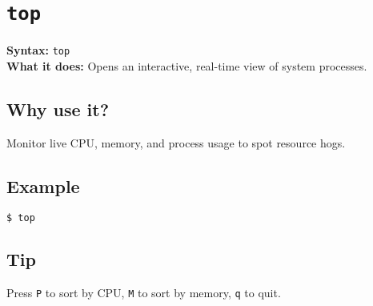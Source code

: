 \documentclass[10pt,oneside]{scrbook}
\begin{document}
\section{\texttt{top}}
\begin{cmdbox}
  \textbf{Syntax:} \lstinline!top! \\
  \textbf{What it does:} Opens an interactive, real-time view of system processes.
\end{cmdbox}
\begin{commanddetails}
  \subsection*{Why use it?}
    Monitor live CPU, memory, and process usage to spot resource hogs.

  \subsection*{Example}
  \begin{lstlisting}[language=bash]
$ top
  \end{lstlisting}

  \subsection*{Tip}
    Press \texttt{P} to sort by CPU, \texttt{M} to sort by memory, \texttt{q} to quit.
\end{commanddetails}

\end{document}
